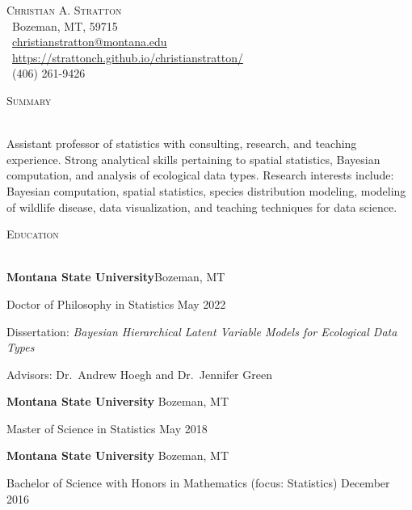 \documentclass[a4paper]{article}
\newcommand{\lineunder} {
	\vspace*{-8pt} \\
	\hspace*{-18pt} \hrulefill \\
}
\newcommand{\header} [1] {
	{\hspace*{-18pt}\vspace*{6pt} \textcolor{Cerulean}{\textsc{#1}}}
	\vspace*{-6pt} \textcolor{Cerulean}{\lineunder}
}
\begin{document}
\vspace*{-40pt}
\vspace*{-10pt}
\begin{center}
{\Huge \scshape {Christian A. Stratton}} \\
\faMapMarker \ Bozeman, MT, 59715 \\
\faEnvelope \ \href{mailto:christianstratton@montana.edu}{christianstratton@montana.edu} \\ 
\faGlobe \ \href{https://strattonch.github.io/christianstratton/}{https://strattonch.github.io/christianstratton/} \\
\faPhone \ (406) 261-9426 \\ 
\end{center}
\vspace*{2mm}

\header{Summary}
\vspace*{2mm}

Assistant professor of statistics with consulting, research, and
teaching experience. Strong analytical skills pertaining to spatial
statistics, Bayesian computation, and analysis of ecological data types.
Research interests include: Bayesian computation, spatial statistics,
species distribution modeling, modeling of wildlife disease, data
visualization, and teaching techniques for data science.

\vspace*{2mm}
\header{Education}
\vspace*{2mm}

\textbf{Montana State University}\hfill Bozeman, MT

Doctor of Philosophy in Statistics \hfill May 2022

Dissertation:
\textit{Bayesian Hierarchical Latent Variable Models for Ecological Data Types}

Advisors: Dr.~Andrew Hoegh and Dr.~Jennifer Green

\vspace{2mm}

\textbf{Montana State University} \hfill Bozeman, MT

Master of Science in Statistics \hfill May 2018

\vspace{2mm}

\textbf{Montana State University} \hfill Bozeman, MT

Bachelor of Science with Honors in Mathematics (focus: Statistics)
\hfill December 2016

\vspace{2mm}
\end{document}
